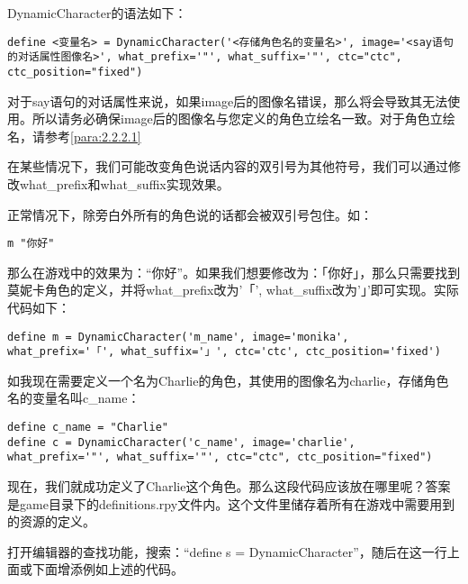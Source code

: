 \documentclass[../../Main.tex]{subfiles}
\begin{document}
DynamicCharacter的语法如下：

\begin{lstlisting}
define <变量名> = DynamicCharacter('<存储角色名的变量名>', image='<say语句的对话属性图像名>', what_prefix='"', what_suffix='"', ctc="ctc", ctc_position="fixed")
\end{lstlisting}

\begin{Warning}
    对于say语句的对话属性来说，如果image后的图像名错误，那么将会导致其无法使用。所以请务必确保image后的图像名与您定义的角色立绘名一致。对于角色立绘名，请参考\ref{para:2.2.2.1}
\end{Warning}

\begin{ExtraKnowledge}
    在某些情况下，我们可能改变角色说话内容的双引号为其他符号，我们可以通过修改what\_prefix和what\_suffix实现效果。

    正常情况下，除旁白外所有的角色说的话都会被双引号包住。如：
    \begin{lstlisting}
m "你好"
    \end{lstlisting}

    那么在游戏中的效果为：“你好”。如果我们想要修改为：「你好」，那么只需要找到莫妮卡角色的定义，并将what\_prefix改为'「', what\_suffix改为'」'即可实现。实际代码如下：
    \begin{lstlisting}
define m = DynamicCharacter('m_name', image='monika', what_prefix='「', what_suffix='」', ctc='ctc', ctc_position='fixed')
    \end{lstlisting}
\end{ExtraKnowledge}

如我现在需要定义一个名为Charlie的角色，其使用的图像名为charlie，存储角色名的变量名叫c\_name：
\begin{lstlisting}
define c_name = "Charlie"
define c = DynamicCharacter('c_name', image='charlie', what_prefix='"', what_suffix='"', ctc="ctc", ctc_position="fixed")
\end{lstlisting}

现在，我们就成功定义了Charlie这个角色。那么这段代码应该放在哪里呢？答案是game目录下的definitions.rpy文件内。这个文件里储存着所有在游戏中需要用到的资源的定义。

打开编辑器的查找功能，搜索：“define s = DynamicCharacter”，随后在这一行上面或下面增添例如上述的代码。
\end{document}

